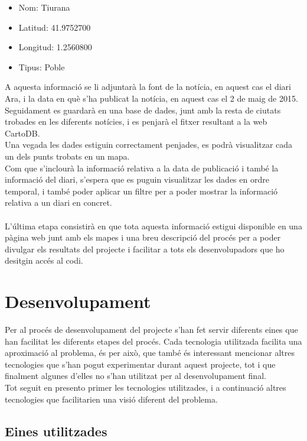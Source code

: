 \documentclass[12pt,a4paper,openright,oneside]{article}
\numberwithin{equation}{section}
\theoremstyle{definition}
\begin{document}
\begin{itemize}
\item Nom: Tiurana
\item Latitud: 41.9752700
\item Longitud: 1.2560800
\item Tipus: Poble
\end{itemize}
A aquesta informació se li adjuntarà la font de la notícia, en aquest cas el diari Ara, i la data en què s'ha publicat la notícia, en aquest cas el 2 de maig de 2015. Seguidament es guardarà en una base de dades, junt amb la resta de ciutats trobades en les diferents notícies, i es penjarà el fitxer resultant a la web CartoDB.\\
Una vegada les dades estiguin correctament penjades, es podrà visualitzar cada un dels punts trobats en un mapa. \\
Com que s'inclourà la informació relativa a la data de publicació i també la informació del diari, s'espera que es puguin visualitzar les dades en ordre temporal, i també poder aplicar un filtre per a poder mostrar la informació relativa a un diari en concret.\\\\
L'última etapa consistirà en que tota aquesta informació estigui disponible en una pàgina web junt amb els mapes i una breu descripció del procés per a poder divulgar els resultats del projecte i facilitar a tots els desenvolupadors que ho desitgin accés al codi.
\newpage
\section{Desenvolupament}
Per al procés de desenvolupament del projecte s'han fet servir diferents eines que han facilitat les diferents etapes del procés. Cada tecnologia utilitzada facilita una aproximació al problema, és per això, que també és interessant mencionar altres tecnologies que s'han pogut experimentar durant aquest projecte, tot i que finalment algunes d'elles no s'han utilitzat per al desenvolupament final.\\ 
Tot seguit en presento primer les tecnologies utilitzades, i a continuació altres tecnologies que facilitarien una visió diferent del problema.
\subsection{Eines utilitzades}
\end{document}

